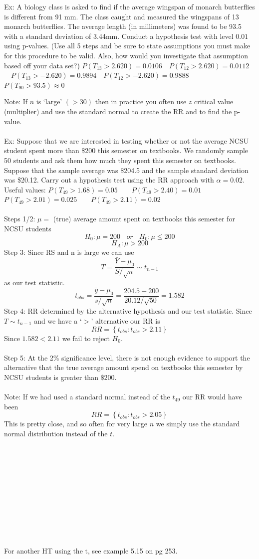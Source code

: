 Ex:  A biology class is asked to find if the average wingspan of monarch butterflies is different from 91 mm. The class caught and measured the wingspans of 13 monarch butterflies. The average length (in millimeters) was found to be 93.5 with a standard deviation of 3.44mm. Conduct a hypothesis test with level $0.01$ using p-values.  (Use all 5 steps and be sure to state assumptions you must make for this procedure to be valid.  Also, how would you investigate that assumption based off your data set?)  $P(T_{13}>2.620)=0.0106$~~$P(T_{12}>2.620)=0.0112$~~$P(T_{13}>-2.620)=0.9894$~~$P(T_{12}>-2.620)=0.9888$~~$P(T_{90}>93.5)\approx 0$

\newpage

Note: If $n$ is `large' $(>30)$ then in practice you often use $z$ critical value (multiplier) and use the standard normal to create the RR and to find the p-value.\\~\\
Ex:  Suppose that we are interested in testing whether or not the average NCSU student spent more than \$200 this semester on textbooks.  We randomly sample 50 students and ask them how much they spent this semester on textbooks.  Suppose that the sample average was \$204.5 and the sample standard deviation was \$20.12.  Carry out a hypothesis test using the RR approach with $\alpha=0.02$. Useful values: $P(T_{49}>1.68)=0.05$~~~~$P(T_{49}>2.40)=0.01$~~~~$P(T_{49}>2.01)=0.025$~~~~$P(T_{49}>2.11)=0.02$\\~\\
Steps 1/2: $\mu=$ (true) average amount spent on textbooks this semester for NCSU students\\
$$H_0: \mu = 200~~~~or~~~~H_0: \mu \leq 200$$
$$H_A: \mu > 200$$
Step 3: Since RS and n is large we can use 
$$T=\frac{\bar{Y}-\mu_{0}}{S/\sqrt{n}}\sim t_{n-1}$$ 
as our test statistic.
$$t_{obs}=\frac{\bar{y}-\mu_{0}}{s/\sqrt{n}}=\frac{204.5-200}{20.12/\sqrt{50}}=1.582$$
Step 4: RR determined by the alternative hypothesis and our test statistic.  Since $T\sim t_{n-1}$ and we have a `$>$' alternative our RR is 
$$RR=\left\{t_{obs}:t_{obs}>2.11\right\}$$
Since $1.582<2.11$ we fail to reject $H_0$.\\~\\
Step 5: At the 2\% significance level, there is not enough evidence to support the alternative that the true average amount spend on textbooks this semester by NCSU students is greater than \$200.\\~\\
Note:  If we had used a standard normal instead of the $t_{49}$ our RR would have been 
$$RR=\left\{t_{obs}:t_{obs}>2.05\right\}$$
This is pretty close, and so often for very large $n$ we simply use the standard normal distribution instead of the $t$.
\\~\\~\\~\\~\\~\\~\\~\\~\\~\\~\\~\\
For another HT using the t, see example 5.15 on pg 253.





